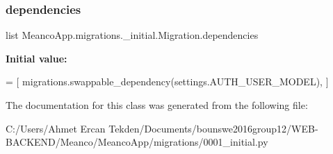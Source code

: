 \subsubsection{\texorpdfstring{dependencies}{dependencies}}
{\footnotesize\ttfamily list Meanco\+App.\+migrations.\+\_\+initial.\+Migration.\+dependencies\hspace{0.3cm}{\ttfamily [static]}}

{\bfseries Initial value\+:}
\begin{DoxyCode}
=  [
        migrations.swappable\_dependency(settings.AUTH\_USER\_MODEL),
    ]
\end{DoxyCode}


The documentation for this class was generated from the following file\+:\begin{DoxyCompactItemize}
\item 
C\+:/\+Users/\+Ahmet Ercan Tekden/\+Documents/bounswe2016group12/\+W\+E\+B-\/\+B\+A\+C\+K\+E\+N\+D/\+Meanco/\+Meanco\+App/migrations/0001\+\_\+initial.\+py\end{DoxyCompactItemize}
